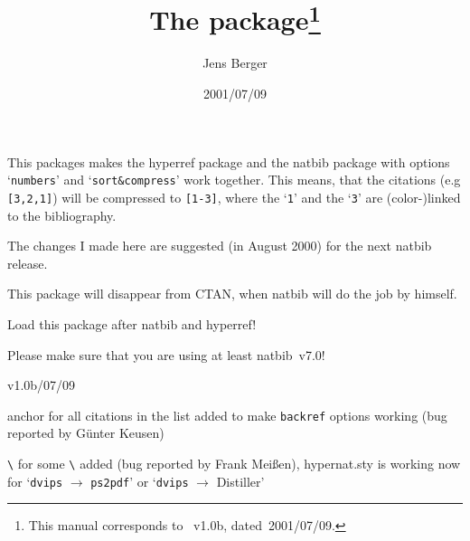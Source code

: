 \documentclass[DIV=8, parskip=half, pagesize=auto]{scrartcl}
\title{The \pkg{hypernat} package\thanks{This manual corresponds to \pkg{hypernat}~v1.0b, dated~2001/07/09.}}
\author{Jens Berger}
\date{2001/07/09}
\makeatletter
\newcommand*{\pkg}[1]{\textsf{#1}}
\newcommand*{\cs}[1]{\texttt{\textbackslash#1}}
\newcommand*{\cmd}[1]{\cs{\expandafter\@gobble\string#1}}
\newcommand*{\opt}[1]{\texttt{#1}}
\makeatother
\begin{document}
\maketitle

\noindent
This packages makes the \pkg{hyperref} package and the \pkg{natbib} package
with options `\opt{numbers}' and `\opt{sort\&compress}' work together. This
means, that the citations (e.g \texttt{[3,2,1]}) will be compressed to
\texttt{[1-3]}, where the `\texttt{1}' and the `\texttt{3}' are (color-)linked to the
bibliography.

The changes I made here are suggested (in August 2000) for the
next \pkg{natbib} release.

This package will disappear from CTAN, when \pkg{natbib} will do
the job by himself.

Load this package after \pkg{natbib} and \pkg{hyperref}!

Please make sure that you are using at least \pkg{natbib}~v7.0!



\begin{labeling}[\hspace{\labelsep}\textendash]{v1.0b/07/09}
\item[v1.0b\enskip 2001/07/09] anchor for all citations in the list
  added to make \opt{backref} options working (bug reported by Günter
  Keusen)

\item[v1.0a\enskip 2001/01/22] \cmd{\noexpand} for some
  \cmd{\hyper@natlinkend} added (bug reported by Frank Meißen),
  \pkg{hypernat.sty} is working now for `\texttt{dvips} $\to$
  \texttt{ps2pdf}' or `\texttt{dvips} $\to$ Distiller'
\end{labeling}
  
\end{document}
